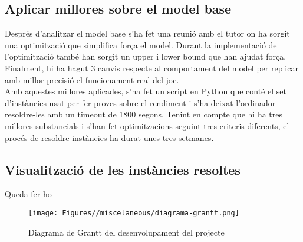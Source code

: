 \subsection{Aplicar millores sobre el model base}
Després d'analitzar el model base s'ha fet una reunió amb el tutor on ha sorgit una optimització que simplifica força el model. Durant la implementació de l'optimització també han sorgit un upper i lower bound que han ajudat força. Finalment, hi ha hagut 3 canvis respecte al comportament del model per replicar amb millor precisió el funcionament real del joc.\\
Amb aquestes millores aplicades, s'ha fet un script en Python que conté el set d'instàncies usat per fer proves sobre el rendiment i s'ha deixat l'ordinador resoldre-les amb un timeout de 1800 segons. Tenint en compte que hi ha tres millores substancials i s'han fet optimitzacions seguint tres criteris diferents, el procés de resoldre instàncies ha durat unes tres setmanes.

\subsection{Visualització de les instàncies resoltes}
Queda fer-ho


\begin{sidewaysfigure}
    \centering
    \texttt{[image: Figures//miscelaneous/diagrama-grantt.png]}
    \caption{Diagrama de Grantt del desenvolupament del projecte}
    \label{fig:diagrama-grantt}
\end{sidewaysfigure}


